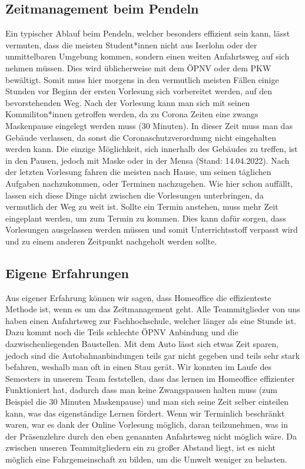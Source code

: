 \documentclass[a4paper,12pt]{scrartcl}
\begin{document}
\subsection{Zeitmanagement beim Pendeln}
Ein typischer Ablauf beim Pendeln, welcher besonders effizient sein kann, lässt vermuten, dass die meisten Student*innen nicht aus Iserlohn oder der unmittelbaren Umgebung kommen, sondern einen weiten Anfahrtsweg auf sich nehmen müssen. Dies wird üblicherweise mit dem ÖPNV oder dem PKW bewältigt. Somit muss hier morgens in den vermutlich meisten Fällen einige Stunden vor Beginn der ersten Vorlesung sich vorbereitet werden, auf den bevorstehenden Weg. Nach der Vorlesung kann man sich mit seinen Kommiliton*innen getroffen werden, da zu Corona Zeiten eine zwangs Maskenpause eingelegt werden muss (30 Minuten). In dieser Zeit muss man das Gebäude verlassen, da sonst die Coronaschutzverordnung nicht eingehalten werden kann. Die einzige Möglichkeit, sich innerhalb des Gebäudes zu treffen, ist in den Pausen, jedoch mit Maske oder in der Mensa (Stand: 14.04.2022). Nach der letzten Vorlesung fahren die meisten nach Hause, um seinen täglichen Aufgaben nachzukommen, oder Terminen nachzugehen. Wie hier schon auffällt, lassen sich diese Dinge nicht zwischen die Vorlesungen unterbringen, da vermutlich der Weg zu weit ist. Sollte ein Termin anstehen, muss mehr Zeit eingeplant werden, um zum Termin zu kommen. Dies kann dafür sorgen, dass Vorlesungen ausgelassen werden müssen und somit Unterrichtsstoff verpasst wird und zu einem anderen Zeitpunkt nachgeholt werden sollte.

\subsection{Eigene Erfahrungen}
Aus eigener Erfahrung können wir sagen, dass Homeoffice die effizienteste Methode ist, wenn es um das Zeitmanagement geht. Alle Teammitglieder von uns haben einen Anfahrtsweg zur Fachhochschule, welcher länger als eine Stunde ist. Dazu kommt noch die Teils schlechte ÖPNV Anbindung und die dazwischenliegenden Baustellen. Mit dem Auto lässt sich etwas Zeit sparen, jedoch sind die Autobahnanbindungen teils gar nicht gegeben und teils sehr stark befahren, weshalb man oft in einen Stau gerät. Wir konnten im Laufe des Semesters in unserem Team feststellen, dass das lernen im Homeoffice effizienter Funktioniert hat, dadurch dass man keine Zwangspausen halten muss (zum Beispiel die 30 Minuten Maskenpause) und man sich seine Zeit selber einteilen kann, was das eigenständige Lernen fördert. Wenn wir Terminlich beschränkt waren, war es dank der Online Vorlesung möglich, daran teilzunehmen, was in der Präsenzlehre durch den eben genannten Anfahrtsweg nicht möglich wäre. Da zwischen unseren Teammitgliedern ein zu großer Abstand liegt, ist es nicht möglich eine Fahrgemeinschaft zu bilden, um die Umwelt weniger zu belasten.
\end{document}
